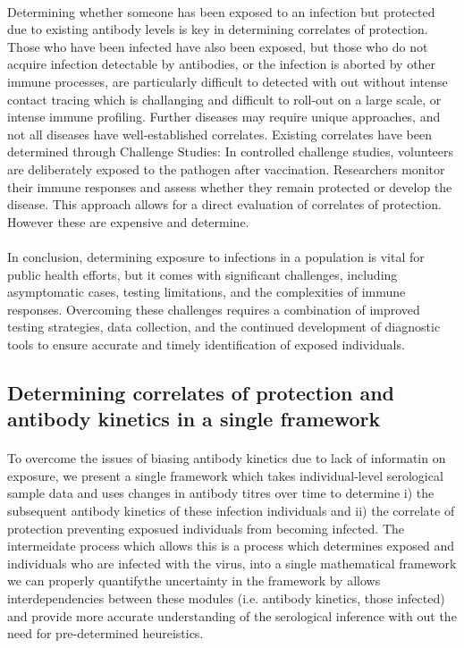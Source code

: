 \documentclass{article}
\begin{document}
\paragraph{}Determining whether someone has been exposed to an infection but protected due to existing antibody levels is key in determining correlates of protection. Those who have been infected have also been exposed, but those who do not acquire infection detectable by antibodies, or the infection is aborted by other immune processes, are particularly difficult to detected with out without intense contact tracing which is challanging and difficult to roll-out on a large scale, or intense immune profiling. Further diseases may require unique approaches, and not all diseases have well-established correlates. Existing correlates have been determined through Challenge Studies: In controlled challenge studies, volunteers are deliberately exposed to the pathogen after vaccination. Researchers monitor their immune responses and assess whether they remain protected or develop the disease. This approach allows for a direct evaluation of correlates of protection. However these are expensive and determine. 


\paragraph{}In conclusion, determining exposure to infections in a population is vital for public health efforts, but it comes with significant challenges, including asymptomatic cases, testing limitations, and the complexities of immune responses. Overcoming these challenges requires a combination of improved testing strategies, data collection, and the continued development of diagnostic tools to ensure accurate and timely identification of exposed individuals.

\subsection{Determining correlates of protection and antibody kinetics in a single framework}
\paragraph{}To overcome the issues of biasing antibody kinetics due to lack of informatin on exposure, we present a single framework which takes individual-level serological sample data and uses changes in antibody titres over time to determine i) the subsequent antibody kinetics of these infection individuals and ii) the correlate of protection preventing exposued individuals from becoming infected. The intermeidate process which allows this is a process which determines exposed and individuals who are infected with the virus, into a single mathematical framework we can properly quantifythe uncertainty in the framework by allows interdependencies between these modules (i.e. antibody kinetics, those infected) and provide more accurate understanding of the serological inference with out the need for pre-determined heureistics. 
\end{document}
